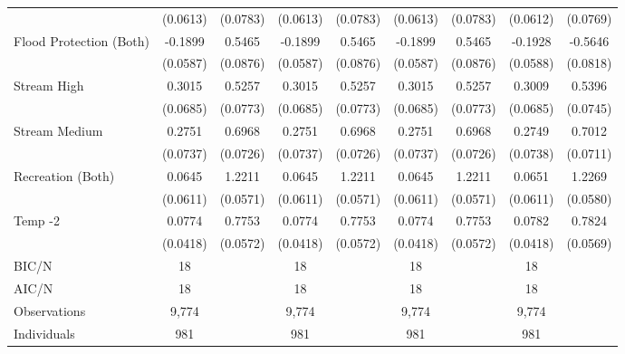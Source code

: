{\begin{tabular}{l*{8}{c}}
                & (0.0613)         & (0.0783)         & (0.0613)         & (0.0783)         & (0.0613)         & (0.0783)         & (0.0612)         & (0.0769)         \\
Flood Protection (Both)&  -0.1899\sym{***}&   0.5465\sym{***}&  -0.1899\sym{***}&   0.5465\sym{***}&  -0.1899\sym{***}&   0.5465\sym{***}&  -0.1928\sym{***}&  -0.5646\sym{***}\\
                & (0.0587)         & (0.0876)         & (0.0587)         & (0.0876)         & (0.0587)         & (0.0876)         & (0.0588)         & (0.0818)         \\
Stream High     &   0.3015\sym{***}&   0.5257\sym{***}&   0.3015\sym{***}&   0.5257\sym{***}&   0.3015\sym{***}&   0.5257\sym{***}&   0.3009\sym{***}&   0.5396\sym{***}\\
                & (0.0685)         & (0.0773)         & (0.0685)         & (0.0773)         & (0.0685)         & (0.0773)         & (0.0685)         & (0.0745)         \\
Stream Medium   &   0.2751\sym{***}&   0.6968\sym{***}&   0.2751\sym{***}&   0.6968\sym{***}&   0.2751\sym{***}&   0.6968\sym{***}&   0.2749\sym{***}&   0.7012\sym{***}\\
                & (0.0737)         & (0.0726)         & (0.0737)         & (0.0726)         & (0.0737)         & (0.0726)         & (0.0738)         & (0.0711)         \\
Recreation (Both)&   0.0645         &   1.2211\sym{***}&   0.0645         &   1.2211\sym{***}&   0.0645         &   1.2211\sym{***}&   0.0651         &   1.2269\sym{***}\\
                & (0.0611)         & (0.0571)         & (0.0611)         & (0.0571)         & (0.0611)         & (0.0571)         & (0.0611)         & (0.0580)         \\
Temp -2         &   0.0774\sym{*}  &   0.7753\sym{***}&   0.0774\sym{*}  &   0.7753\sym{***}&   0.0774\sym{*}  &   0.7753\sym{***}&   0.0782\sym{*}  &   0.7824\sym{***}\\
                & (0.0418)         & (0.0572)         & (0.0418)         & (0.0572)         & (0.0418)         & (0.0572)         & (0.0418)         & (0.0569)         \\
\hline
BIC/N           &       18         &                  &       18         &                  &       18         &                  &       18         &                  \\
AIC/N           &       18         &                  &       18         &                  &       18         &                  &       18         &                  \\
Observations    &    9,774         &                  &    9,774         &                  &    9,774         &                  &    9,774         &                  \\
Individuals     &      981         &                  &      981         &                  &      981         &                  &      981         &                  \\
\hline\hline
\end{tabular}
}
